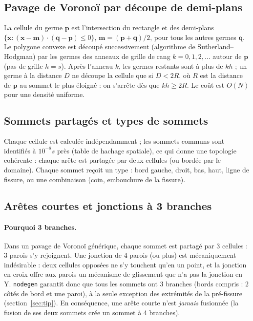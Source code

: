 \documentclass[11pt,a4paper]{article}
\newcommand{\code}[1]{\texttt{#1}}
\newcommand{\toolgen}{\code{nodegen}}
\begin{document}
\subsection{Pavage de Voronoï par découpe de demi-plans}

La cellule du germe $\mathbf p$ est l'intersection du rectangle et des demi-plans
$\{\mathbf x : (\mathbf x-\mathbf m)\cdot(\mathbf q-\mathbf p)\le 0\}$, $\mathbf m=(\mathbf p+\mathbf q)/2$, pour
tous les autres germes $\mathbf q$. Le polygone convexe est découpé successivement (algorithme de
Sutherland--Hodgman) par les germes des anneaux de grille de rang $k=0,1,2,\dots$ autour de $\mathbf p$ (pas de
grille $h=s$). Après l'anneau $k$, les germes restants sont à plus de $kh$ ; un germe à la distance $D$ ne
découpe la cellule que si $D<2R$, où $R$ est la distance de $\mathbf p$ au sommet le plus éloigné : on s'arrête
dès que $kh\ge2R$. Le coût est $O(N)$ pour une densité uniforme.

\subsection{Sommets partagés et types de sommets}

Chaque cellule est calculée indépendamment ; les sommets communs sont identifiés à $10^{-8}s$ près (table de
hachage spatiale), ce qui donne une topologie cohérente : chaque arête est partagée par deux cellules (ou bordée
par le domaine). Chaque sommet reçoit un type : bord gauche, droit, bas, haut, ligne de fissure, ou une
combinaison (coin, embouchure de la fissure).

\subsection{Arêtes courtes et jonctions à 3 branches}
\label{sec:short}

\paragraph{Pourquoi 3 branches.} Dans un pavage de Voronoï générique, chaque sommet est partagé par 3 cellules :
3 parois s'y rejoignent. Une jonction de 4 parois (ou plus) est mécaniquement indésirable : deux cellules opposées
ne s'y touchent qu'en un point, et la jonction en croix offre aux parois un mécanisme de glissement que n'a pas
la jonction en Y. \toolgen{} garantit donc que tous les sommets ont 3 branches (bords compris : 2 côtés de bord
et une paroi), à la seule exception des extrémités de la pré-fissure (section~\ref{sec:tip}). En conséquence, une
arête courte n'est \emph{jamais} fusionnée (la fusion de ses deux sommets crée un sommet à 4 branches).
\end{document}
